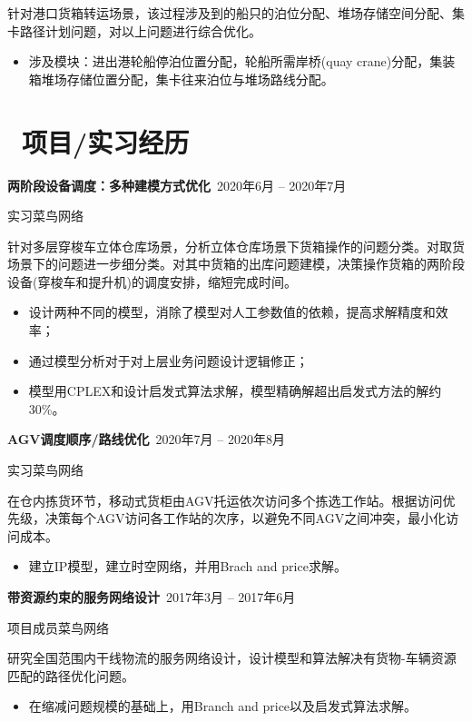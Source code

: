 \documentclass[11pt]{article}
\begin{document}
针对港口货箱转运场景，该过程涉及到的船只的泊位分配、堆场存储空间分配、集卡路径计划问题，对以上问题进行综合优化。

\begin{itemize}
  \item 涉及模块：进出港轮船停泊位置分配，轮船所需岸桥(quay crane)分配，集装箱堆场存储位置分配，集卡往来泊位与堆场路线分配。
\end{itemize}

\section{\makebox[\widthof{\faGraduationCap}][c]{\color{CVBlue}\faUsers}\ 项目/实习经历}

\textbf{两阶段设备调度：多种建模方式优化}\  \hfill 2020年6月 -- 2020年7月

实习\quad 菜鸟网络

针对多层穿梭车立体仓库场景，分析立体仓库场景下货箱操作的问题分类。对取货场景下的问题进一步细分类。对其中货箱的出库问题建模，决策操作货箱的两阶段设备(穿梭车和提升机)的调度安排，缩短完成时间。

\begin{itemize}
  \item 设计两种不同的模型，消除了模型对人工参数值的依赖，提高求解精度和效率；
  \item 通过模型分析对于对上层业务问题设计逻辑修正；
  \item 模型用CPLEX和设计启发式算法求解，模型精确解超出启发式方法的解约30\%。
\end{itemize}

\textbf{AGV调度顺序/路线优化}\  \hfill 2020年7月 -- 2020年8月

实习\quad 菜鸟网络

在仓内拣货环节，移动式货柜由AGV托运依次访问多个拣选工作站。根据访问优先级，决策每个AGV访问各工作站的次序，以避免不同AGV之间冲突，最小化访问成本。

\begin{itemize}
  \item 建立IP模型，建立时空网络，并用Brach and price求解。
\end{itemize}

\textbf{带资源约束的服务网络设计}\  \hfill 2017年3月 -- 2017年6月

项目成员\quad 菜鸟网络

研究全国范围内干线物流的服务网络设计，设计模型和算法解决有货物-车辆资源匹配的路径优化问题。

\begin{itemize}
  \item 在缩减问题规模的基础上，用Branch and price以及启发式算法求解。
\end{itemize}
\end{document}
